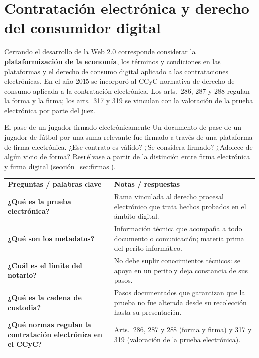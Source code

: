 \documentclass[12pt,oneside]{book}
\newcommand{\cq}[1]{\textbf{#1}}
\newcommand{\cornell}[3]{%
  \par\medskip\noindent\begingroup
  \renewcommand{\arraystretch}{1.25}%
  \begin{tabularx}{\textwidth}{|>{\raggedright\arraybackslash}p{0.27\textwidth}|>{\raggedright\arraybackslash}X|}
    \hline
    \multicolumn{2}{|>{\centering\arraybackslash}X|}{\cellcolor{azulacad!12}\textbf{Cuadro Cornell --- #1}}\\ \hline
    \cellcolor{gray!10}\textbf{Preguntas / palabras clave} & \cellcolor{gray!10}\textbf{Notas / respuestas} \\ \hline
    #2
    \multicolumn{2}{|>{\raggedright\arraybackslash}X|}{\cellcolor{azulacad!6}\textbf{Resumen.} #3}\\ \hline
  \end{tabularx}%
  \endgroup\par\medskip}
\begin{document}
\section{Contratación electrónica y derecho del consumidor digital}

Cerrando el desarrollo de la Web 2.0 corresponde considerar la \textbf{plataformización de la economía}, los términos y condiciones en las plataformas y el derecho de consumo digital aplicado a las contrataciones electrónicas. En el año 2015 se incorporó al CCyC normativa de derecho de consumo aplicada a la contratación electrónica. Los arts.~286, 287 y 288 regulan la forma y la firma; los arts.~317 y 319 se vinculan con la valoración de la prueba electrónica por parte del juez.

\begin{exercise}{El pase de un jugador firmado electrónicamente}
Un documento de pase de un jugador de fútbol por una suma relevante fue firmado a través de una plataforma de firma electrónica. ¿Ese contrato es válido? ¿Se considera firmado? ¿Adolece de algún vicio de forma? Resuélvase a partir de la distinción entre firma electrónica y firma digital (sección~\ref{sec:firmas}).
\end{exercise}

\cornell{Prueba electrónica y contratación electrónica}{
\cq{¿Qué es la prueba electrónica?} & Rama vinculada al derecho procesal electrónico que trata hechos probados en el ámbito digital. \\ \hline
\cq{¿Qué son los metadatos?} & Información técnica que acompaña a todo documento o comunicación; materia prima del perito informático. \\ \hline
\cq{¿Cuál es el límite del notario?} & No debe suplir conocimientos técnicos: se apoya en un perito y deja constancia de sus pasos. \\ \hline
\cq{¿Qué es la cadena de custodia?} & Pasos documentados que garantizan que la prueba no fue alterada desde su recolección hasta su presentación. \\ \hline
\cq{¿Qué normas regulan la contratación electrónica en el CCyC?} & Arts.~286, 287 y 288 (forma y firma) y 317 y 319 (valoración de la prueba electrónica). \\ \hline
}{La prueba digital es volátil y exige actas notariales, peritos y cadena de custodia. La contratación electrónica y de consumo se regula en el CCyC y se conecta con la distinción entre firma electrónica y firma digital.}

\end{document}
